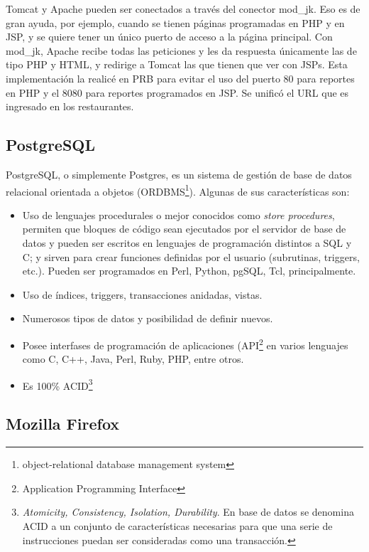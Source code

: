 Tomcat y Apache pueden ser conectados a través del conector mod\_jk. Eso es de gran ayuda, por ejemplo, cuando se tienen páginas programadas en PHP y en JSP, y se quiere tener un único puerto de acceso a la página principal. Con mod\_jk, Apache recibe todas las peticiones y les da respuesta únicamente las de tipo PHP y HTML, y redirige a Tomcat las que tienen que ver con JSPs. Esta implementación la realicé en PRB para evitar el uso del puerto 80 para reportes en PHP y el 8080 para reportes programados en JSP. Se unificó el URL que es ingresado en los restaurantes.

\subsection{PostgreSQL}
\label{sec:postgresql}

PostgreSQL, o simplemente Postgres, es un sistema de gestión de base de datos relacional orientada a objetos (ORDBMS\footnote{object-relational database management system}). Algunas de sus características son:

\begin{itemize}
 \item Uso de lenguajes procedurales o mejor conocidos como \textit{store procedures}, permiten que bloques de código sean ejecutados por el servidor de base de datos y pueden ser escritos en lenguajes de programación distintos a SQL y C; y sirven para crear funciones definidas por el usuario (subrutinas, triggers, etc.). Pueden ser programados en Perl, Python, pgSQL, Tcl, principalmente.
 \item Uso de índices, triggers, transacciones anidadas, vistas.
 \item Numerosos tipos de datos y posibilidad de definir nuevos.
 \item Posee interfases de programación de aplicaciones (API\footnote{Application Programming Interface} en varios lenguajes como C, C++, Java, Perl, Ruby, PHP, entre otros.
 \item Es 100\% ACID\footnote{\textit{Atomicity, Consistency, Isolation, Durability}. En base de datos se denomina ACID a un conjunto de características necesarias para que una serie de instrucciones puedan ser consideradas como una transacción.}
\end{itemize}

\subsection{Mozilla Firefox}
\label{sec:firefox}

